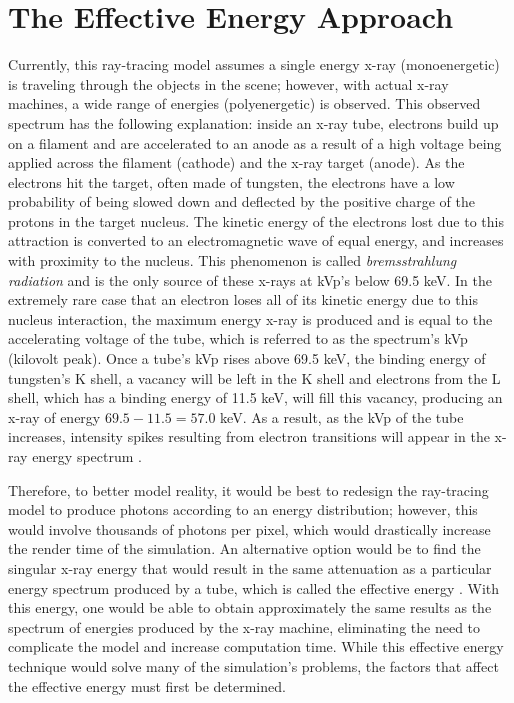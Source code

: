 %

\chapter{The Effective Energy Approach}
\label{cha:xray_tracer_validation}

\par Currently, this ray-tracing model assumes a single energy x-ray (monoenergetic) is traveling through the objects in the scene; however, with actual x-ray machines, a wide range of energies (polyenergetic) is observed. This observed spectrum has the following explanation: inside an x-ray tube, electrons build up on a filament and are accelerated to an anode as a result of a high voltage being applied across the filament (cathode) and the x-ray target (anode). As the electrons hit the target, often made of tungsten, the electrons have a low probability of being slowed down and deflected by the positive charge of the protons in the target nucleus. The kinetic energy of the electrons lost due to this attraction is converted to an electromagnetic wave of equal energy, and increases with proximity to the nucleus. This phenomenon is called \textit{bremsstrahlung radiation} and is the only source of these x-rays at kVp's below 69.5 keV. In the extremely rare case that an electron loses all of its kinetic energy due to this nucleus interaction, the maximum energy x-ray is produced and is equal to the accelerating voltage of the tube, which is referred to as the spectrum's kVp (kilovolt peak). Once a tube's kVp rises above 69.5 keV, the binding energy of tungsten's K shell, a vacancy will be left in the K shell and electrons from the L shell, which has a binding energy of 11.5 keV, will fill this vacancy, producing an x-ray of energy $69.5 - 11.5 = 57.0$ keV. As a result, as the kVp of the tube increases, intensity spikes resulting from electron transitions will appear in the x-ray energy spectrum \cite{Seibert}.

\par Therefore, to better model reality, it would be best to redesign the ray-tracing model to produce photons according to an energy distribution; however, this would involve thousands of photons per pixel, which would drastically increase the render time of the simulation. An alternative option would be to find the singular x-ray energy that would result in the same attenuation as a particular energy spectrum produced by a tube, which is called the effective energy \cite{Seibert}. With this energy, one would be able to obtain approximately the same results as the spectrum of energies produced by the x-ray machine, eliminating the need to complicate the model and increase computation time. While this effective energy technique would solve many of the simulation's problems, the factors that affect the effective energy must first be determined.

